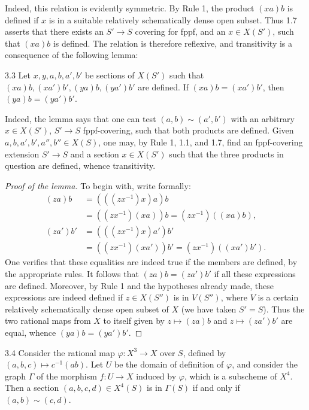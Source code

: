 Indeed, this relation is
evidently symmetric.
By Rule 1, the product
\((xa)b\) is defined if
\(x\) is \og in\fg{} a
suitable relatively schematically
dense open subset.
Thus 1.7 asserts that
there exists an \(S'\to S\)
covering for fppf, and
an \(x\in X(S')\), such
that \((xa)b\) is defined.
The relation is therefore
reflexive, and transitivity
is a consequence of the
following lemma:
\begin{lemma}{3.3}\label{XVIII.3.3}
Let \(x,y,a,b,a',b'\) be
sections of \(X(S')\) such
that \((xa)b,(xa')b',(ya)b,(ya')b'\)
are defined.
If \((xa)b=(xa')b'\),
then \((ya)b=(ya')b'\).
\end{lemma}
Indeed, the lemma says
that one can test
\((a,b)\sim(a',b')\) with
an arbitrary \(x\in X(S')\),
\(S'\to S\) fppf-covering,
such that both products
are defined.
Given \(a,b,a',b',a'',b''\in X(S)\),
one may, by Rule 1, 1.1,
and 1.7, find an fppf-covering
extension \(S'\to S\) and
a section \(x\in X(S')\)
such that the three products
in question are defined,
whence transitivity.
\begin{proof}[Proof of the lemma]
To begin with, write formally:
\[
\begin{aligned}
(za)b
 &=(((zx^{-1})x)a)b\\
 &=((zx^{-1})(xa))b=(zx^{-1})((xa)b),\\
(za')b'
 &=(((zx^{-1})x)a')b'\\
 &=((zx^{-1})(xa'))b'=(zx^{-1})((xa')b').
\end{aligned}
\]
One verifies that these
equalities are indeed true
if the members are defined,
by the appropriate rules.
It follows that
\((za)b=(za')b'\) if
all these expressions are
defined.
Moreover, by Rule 1 and
the hypotheses already made,
these expressions are indeed
defined if \(z\in X(S'')\)
is in \(V(S'')\), where
\(V\) is a certain relatively
schematically dense open
subset of \(X\) (we have
taken \(S'=S\)).
Thus the two rational
maps from \(X\) to itself
given by \(z\mapsto(za)b\)
and \(z\mapsto(za')b'\)
are equal, whence
\((ya)b=(ya')b'\).
\end{proof}
\begin{lemma}{3.4}\label{XVIII.3.4}
Consider the rational map
\(\varphi:X^3\to X\)
over \(S\), defined by
\((a,b,c)\mapsto c^{-1}(ab)\).
Let \(U\) be the domain
of definition of \(\varphi\),
and consider the graph
\(\Gamma\) of the morphism
\(f:U\to X\) induced by
\(\varphi\), which is a
subscheme of \(X^4\).
Then a section
\((a,b,c,d)\in X^4(S)\)
is in \(\Gamma(S)\)
if and only if \((a,b)\sim(c,d)\).
\end{lemma}
